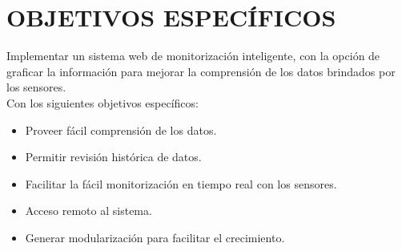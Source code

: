 \section*{OBJETIVOS ESPECÍFICOS}

\large{Implementar un sistema web de monitorización inteligente, con la opción de graficar la información para mejorar la comprensión de los datos brindados por los sensores.}\\[1cm]
\large{Con los siguientes objetivos específicos: }
\begin{itemize}
    \item Proveer fácil comprensión de los datos.
    \item Permitir revisión histórica de datos.
    \item Facilitar la fácil monitorización en tiempo real con los sensores.
    \item Acceso remoto al sistema.
    \item Generar modularización para facilitar el crecimiento.
\end{itemize}